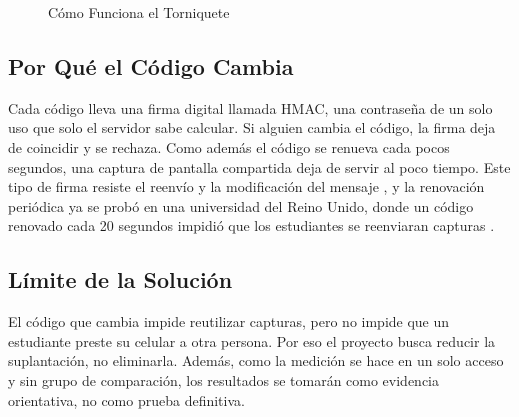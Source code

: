 \begin{figure}[tbp]
	\caption{Cómo Funciona el Torniquete}
	\label{fig:flujo}
	\centering
\end{figure}

\subsection{Por Qué el Código Cambia}
Cada código lleva una firma digital llamada HMAC, una contraseña de un solo
uso que solo el servidor sabe calcular. Si alguien cambia el código, la firma
deja de coincidir y se rechaza. Como además el código se renueva cada pocos
segundos, una captura de pantalla compartida deja de servir al poco tiempo.
Este tipo de firma resiste el reenvío y la modificación del mensaje
\parencite{subpratatsavee2015hmac}, y la renovación periódica ya se probó en
una universidad del Reino Unido, donde un código renovado cada 20 segundos
impidió que los estudiantes se reenviaran capturas \parencite{nwabuwe2023dynamicqr}.

\subsection{Límite de la Solución}
El código que cambia impide reutilizar capturas, pero no impide que un
estudiante preste su celular a otra persona. Por eso el proyecto busca reducir
la suplantación, no eliminarla. Además, como la medición se hace en un solo
acceso y sin grupo de comparación, los resultados se tomarán como evidencia
orientativa, no como prueba definitiva.
